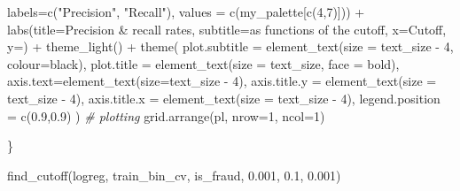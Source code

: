 \documentclass[
]{report}
\newenvironment{Shaded}{\begin{snugshade}}{\end{snugshade}}
\newcommand{\AttributeTok}[1]{\textcolor[rgb]{0.77,0.63,0.00}{#1}}
\newcommand{\CommentTok}[1]{\textcolor[rgb]{0.56,0.35,0.01}{\textit{#1}}}
\newcommand{\DecValTok}[1]{\textcolor[rgb]{0.00,0.00,0.81}{#1}}
\newcommand{\FloatTok}[1]{\textcolor[rgb]{0.00,0.00,0.81}{#1}}
\newcommand{\FunctionTok}[1]{\textcolor[rgb]{0.00,0.00,0.00}{#1}}
\newcommand{\NormalTok}[1]{#1}
\newcommand{\SpecialCharTok}[1]{\textcolor[rgb]{0.00,0.00,0.00}{#1}}
\newcommand{\StringTok}[1]{\textcolor[rgb]{0.31,0.60,0.02}{#1}}
\begin{document}
\begin{Shaded}
\begin{Highlighting}[]
                        \AttributeTok{labels=}\FunctionTok{c}\NormalTok{(}\StringTok{"Precision"}\NormalTok{, }\StringTok{"Recall"}\NormalTok{),}
                        \AttributeTok{values =} \FunctionTok{c}\NormalTok{(my\_palette[}\FunctionTok{c}\NormalTok{(}\DecValTok{4}\NormalTok{,}\DecValTok{7}\NormalTok{)]))  }\SpecialCharTok{+}
    \FunctionTok{labs}\NormalTok{(}\AttributeTok{title=}\StringTok{\textquotesingle{}Precision \& recall rates\textquotesingle{}}\NormalTok{,}
         \AttributeTok{subtitle=}\StringTok{\textquotesingle{}as functions of the cutoff\textquotesingle{}}\NormalTok{,}
         \AttributeTok{x=}\StringTok{\textquotesingle{}Cutoff\textquotesingle{}}\NormalTok{, }\AttributeTok{y=}\StringTok{\textquotesingle{}\textquotesingle{}}\NormalTok{) }\SpecialCharTok{+}
   \FunctionTok{theme\_light}\NormalTok{() }\SpecialCharTok{+}
    \FunctionTok{theme}\NormalTok{(}
      \AttributeTok{plot.subtitle =} \FunctionTok{element\_text}\NormalTok{(}\AttributeTok{size =}\NormalTok{ text\_size }\SpecialCharTok{{-}} \DecValTok{4}\NormalTok{, }\AttributeTok{colour=}\StringTok{\textquotesingle{}black\textquotesingle{}}\NormalTok{),}
      \AttributeTok{plot.title =} \FunctionTok{element\_text}\NormalTok{(}\AttributeTok{size =}\NormalTok{ text\_size, }\AttributeTok{face =} \StringTok{\textquotesingle{}bold\textquotesingle{}}\NormalTok{),}
      \AttributeTok{axis.text=}\FunctionTok{element\_text}\NormalTok{(}\AttributeTok{size=}\NormalTok{text\_size }\SpecialCharTok{{-}} \DecValTok{4}\NormalTok{), }
      \AttributeTok{axis.title.y =} \FunctionTok{element\_text}\NormalTok{(}\AttributeTok{size =}\NormalTok{ text\_size }\SpecialCharTok{{-}} \DecValTok{4}\NormalTok{), }
      \AttributeTok{axis.title.x =} \FunctionTok{element\_text}\NormalTok{(}\AttributeTok{size =}\NormalTok{ text\_size }\SpecialCharTok{{-}} \DecValTok{4}\NormalTok{),}
      \AttributeTok{legend.position =} \FunctionTok{c}\NormalTok{(}\FloatTok{0.9}\NormalTok{,}\FloatTok{0.9}\NormalTok{)}
\NormalTok{    )}
  \CommentTok{\# plotting}
  \FunctionTok{grid.arrange}\NormalTok{(pl, }\AttributeTok{nrow=}\DecValTok{1}\NormalTok{, }\AttributeTok{ncol=}\DecValTok{1}\NormalTok{)}
  
\NormalTok{\}}
\end{Highlighting}
\end{Shaded}

\begin{Shaded}
\begin{Highlighting}[]
\FunctionTok{find\_cutoff}\NormalTok{(logreg, train\_bin\_cv, }\StringTok{\textquotesingle{}is\_fraud\textquotesingle{}}\NormalTok{, }\FloatTok{0.001}\NormalTok{, }\FloatTok{0.1}\NormalTok{, }\FloatTok{0.001}\NormalTok{)}
\end{Highlighting}
\end{Shaded}
\end{document}
